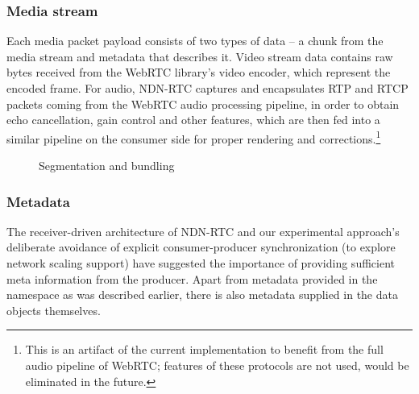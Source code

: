 \documentclass{icn/sig-alternate-2013} %
\newcommand{\ndnrtcName}{NDN-RTC} %
\begin{document}
\subsubsection{Media stream}
Each media packet payload consists of two types of data -- a chunk from the media stream and metadata that describes it. Video stream data contains raw bytes received from the WebRTC library's video encoder, which represent the encoded frame. For audio, \ndnrtcName{} captures and encapsulates RTP and RTCP packets coming from the WebRTC audio processing pipeline, in order to obtain echo cancellation, gain control and other features, which are then fed into a similar pipeline on the consumer side for proper rendering and corrections.\footnote{This is an artifact of the current implementation to benefit from the full audio pipeline of WebRTC; features of these protocols are not used, would be eliminated in the future.}

\begin{figure}[t!]
\centering
{}
\caption{Segmentation and bundling}
\end{figure}

\subsubsection{Metadata}

The receiver-driven architecture of \ndnrtcName{} and our experimental approach's deliberate avoidance of explicit consumer-producer synchronization (to explore network scaling support) have suggested the importance of providing sufficient meta information from the producer. Apart from metadata provided in the namespace as was described earlier, there is also metadata supplied in the data objects themselves.
%
\end{document}
